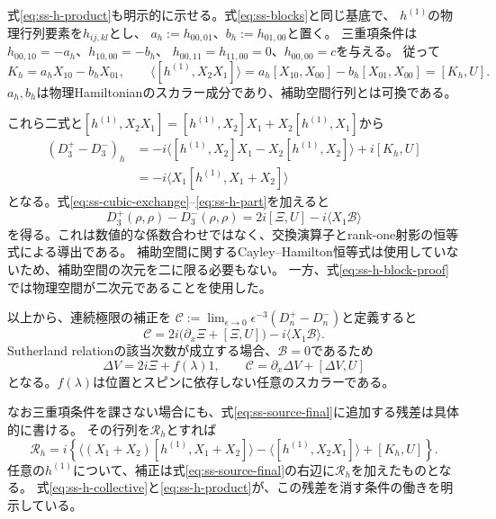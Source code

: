 式\eqref{eq:ss-h-product}も明示的に示せる。式\eqref{eq:ss-blocks}と同じ基底で、
$h^{(1)}$の物理行列要素を$h_{ij,kl}$とし、
$a_h:=h_{00,01}$、$b_h:=h_{01,00}$と置く。
三重項条件は$h_{00,10}=-a_h$、$h_{10,00}=-b_h$、
$h_{00,11}=h_{11,00}=0$、$h_{00,00}=c$を与える。
従って
\begin{equation}
K_h=a_hX_{10}-b_hX_{01},\qquad
\langle[h^{(1)},X_2X_1]\rangle
=a_h[X_{10},X_{00}]-b_h[X_{01},X_{00}]=[K_h,U].
\label{eq:ss-h-block-proof}
\end{equation}
$a_h,b_h$は物理Hamiltonianのスカラー成分であり、補助空間行列とは可換である。

これら二式と$[h^{(1)},X_2X_1]=[h^{(1)},X_2]X_1+X_2[h^{(1)},X_1]$から
\begin{align}
(D_3^+-D_3^-)_{h}
&=-i\langle[h^{(1)},X_2]X_1-X_2[h^{(1)},X_2]\rangle+i[K_h,U]
\nonumber\\
&=-i\langle X_1[h^{(1)},X_1+X_2]\rangle
\label{eq:ss-h-part}
\end{align}
となる。式\eqref{eq:ss-cubic-exchange}--\eqref{eq:ss-h-part}を加えると
\begin{equation}
D_3^+(\rho,\rho)-D_3^-(\rho,\rho)
=2i[\Xi,U]-i\langle X_1\mathcal B\rangle
\label{eq:ss-cubic-final}
\end{equation}
を得る。これは数値的な係数合わせではなく、交換演算子とrank-one射影の恒等式による導出である。
補助空間に関するCayley--Hamilton恒等式は使用していないため、補助空間の次元を二に限る必要もない。
一方、式\eqref{eq:ss-h-block-proof}では物理空間が二次元であることを使用した。

以上から、連続極限の補正を
$\mathcal C:=\lim_{\epsilon\to0}\epsilon^{-3}(D_n^+-D_n^-)$と定義すると
\begin{equation}
\mathcal C=2i\bigl(\partial_x\Xi+[\Xi,U]\bigr)-i\langle X_1\mathcal B\rangle.
\label{eq:ss-source-final}
\end{equation}
Sutherland relationの該当次数が成立する場合、$\mathcal B=0$であるため
\begin{equation}
\Delta V=2i\Xi+f(\lambda)1,
\qquad \mathcal C=\partial_x\Delta V+[\Delta V,U]
\label{eq:ss-DeltaV}
\end{equation}
となる。$f(\lambda)$は位置とスピンに依存しない任意のスカラーである。

なお三重項条件を課さない場合にも、式\eqref{eq:ss-source-final}に追加する残差は具体的に書ける。
その行列を$\mathcal R_h$とすれば
\begin{equation}
\mathcal R_h=i\left\{
\langle(X_1+X_2)[h^{(1)},X_1+X_2]\rangle
-\langle[h^{(1)},X_2X_1]\rangle+[K_h,U]\right\}.
\label{eq:ss-h-defect}
\end{equation}
任意の$h^{(1)}$について、補正は式\eqref{eq:ss-source-final}の右辺に$\mathcal R_h$を加えたものとなる。
式\eqref{eq:ss-h-collective}と\eqref{eq:ss-h-product}が、この残差を消す条件の働きを明示している。

